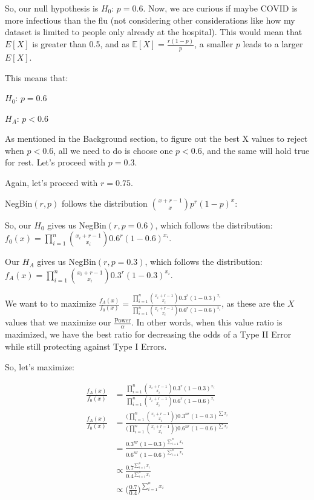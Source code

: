 \documentclass[
  letterpaper,
  DIV=11,
  numbers=noendperiod]{scrreprt}
\begin{document}
So, our null hypothesis is \(H_0\): \(p = 0.6\). Now, we are curious if
maybe COVID is more infectious than the flu (not considering other
considerations like how my dataset is limited to people only already at
the hospital). This would mean that \(E[X]\) is greater than 0.5, and as
\(\mathbb{E}[X] = \frac{r(1-p)}{p}\), a smaller \(p\) leads to a larger
\(E[X]\).

This means that:

\(H_0\): \(p = 0.6\)

\(H_A\): \(p < 0.6\)

As mentioned in the Background section, to figure out the best X values
to reject when \(p<0.6\), all we need to do is choose one \(p<0.6\), and
the same will hold true for rest. Let's proceed with \(p=0.3\).

Again, let's proceed with \(r=0.75\).

NegBin\((r, p)\) follows the distribution
\(\binom{x + r - 1}{x} p^r (1 - p)^x\):

So, our \(H_0\) gives us NegBin\((r, p=0.6)\), which follows the
distribution:
\(f_0(x) = \prod _{i=1}^n \binom{x_i + r - 1}{x_i} 0.6^r (1 - 0.6)^{x_i}\).

Our \(H_A\) gives us NegBin\((r, p=0.3)\), which follows the
distribution:
\(f_A(x) = \prod _{i=1}^n \binom{x_i + r - 1}{x_i} 0.3^r (1 - 0.3)^{x_i}\).

We want to to maximize
\(\frac{f_A(x)}{f_0(x)} = \frac{\prod _{i=1}^n \binom{x_i + r - 1}{x_i} 0.3^r (1 - 0.3)^{x_i}}{\prod _{i=1}^n \binom{x_i + r - 1}{x_i} 0.6^r (1 - 0.6)^{x_i}}\),
as these are the \(X\) values that we maximize our
\(\frac{\text{Power}}{\alpha}\). In other words, when this value ratio
is maximized, we have the best ratio for decreasing the odds of a Type
II Error while still protecting against Type I Errors.

So, let's maximize:

\[
\begin{aligned}
\frac{f_A(x)}{f_0(x)} &= \frac{\prod _{i=1}^n \binom{x_i + r - 1}{x_i} 0.3^r (1 - 0.3)^{x_i}}{ \prod_{i=1}^n \binom{x_i + r - 1}{x_i} 0.6^r (1 - 0.6)^{x_i}} \\
\frac{f_A(x)}{f_0(x)} &= \frac{ \Big( \prod _{i=1}^n \binom{x_i + r - 1}{x_i} \Big) 0.3^{nr} (1 - 0.3)^{\sum x_i}}{ \Big( \prod _{i=1}^n \binom{x_i + r - 1}{x_i} \Big) 0.6^{nr} (1 - 0.6)^{\sum x_i}} \\
&= \frac{0.3^{nr} (1 - 0.3)^{\sum_{i=1}^n x_i}}{ 0.6^{nr} (1 - 0.6)^{\sum_{i=1}^n x_i}} \\
&\propto \frac{0.7^{\sum_{i=1}^n x_i}}{0.4^{\sum_{i=1}^n x_i}} \\
&\propto \Big(\frac{0.7}{0.4}\Big)^ {\sum_{i=1}^n x_i} \\
\end{aligned}
\]
\end{document}
